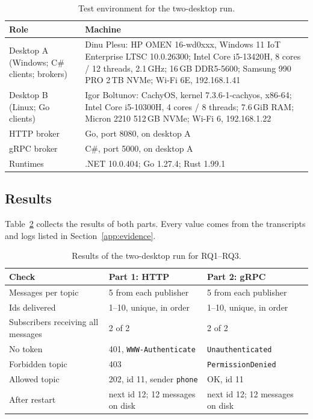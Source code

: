 \documentclass[12pt,a4paper]{article}
\begin{document}
\begin{table}[H]
\centering
\small
\begin{tabularx}{\textwidth}{@{}l X@{}}
\toprule
\textbf{Role} & \textbf{Machine} \\
\midrule
Desktop A (Windows; C\# clients; brokers) & Dinu Plesu: HP OMEN 16-wd0xxx, Windows 11 IoT Enterprise LTSC 10.0.26300; Intel Core i5-13420H, 8 cores / 12 threads, 2.1\,GHz; 16\,GB DDR5-5600; Samsung 990 PRO 2\,TB NVMe; Wi-Fi 6E, 192.168.1.41 \\
Desktop B (Linux; Go clients) & Igor Boltunov: CachyOS, kernel 7.3.6-1-cachyos, x86-64; Intel Core i5-10300H, 4 cores / 8 threads; 7.6\,GiB RAM; Micron 2210 512\,GB NVMe; Wi-Fi 6, 192.168.1.22 \\
HTTP broker & Go, port 8080, on desktop A \\
gRPC broker & C\#, port 5000, on desktop A \\
Runtimes &.NET 10.0.404; Go 1.27.4; Rust 1.99.1 \\
\bottomrule
\end{tabularx}
\caption{Test environment for the two-desktop run.}
\label{tab:env}
\end{table}

\subsection{Results}
Table~\ref{tab:results} collects the results of both parts. Every value comes from
the transcripts and logs listed in Section~\ref{app:evidence}.

\begin{table}[H]
\centering
\small
\begin{tabularx}{\textwidth}{@{}l X X@{}}
\toprule
\textbf{Check} & \textbf{Part 1: HTTP} & \textbf{Part 2: gRPC} \\
\midrule
Messages per topic & 5 from each publisher & 5 from each publisher \\
Ids delivered & 1--10, unique, in order & 1--10, unique, in order \\
Subscribers receiving all messages & 2 of 2 & 2 of 2 \\
No token & 401, \texttt{WWW-Authenticate} & \texttt{Unauthenticated} \\
Forbidden topic & 403 & \texttt{PermissionDenied} \\
Allowed topic & 202, id 11, sender \texttt{phone} & OK, id 11 \\
After restart & next id 12; 12 messages on disk & next id 12; 12 messages on disk \\
\bottomrule
\end{tabularx}
\caption{Results of the two-desktop run for RQ1--RQ3.}
\label{tab:results}
\end{table}
\end{document}
